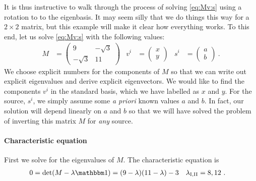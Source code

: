 \documentclass[12pt, oneside]{report}    %
\begin{document}
It is thus instructive to walk through the process of solving \eqref{eq:Mv:s} using a rotation to to the eigenbasis. It may seem silly that we do things this way for a $2\times 2$ matrix, but this example will make it clear how everything works. To this end, let us solve \eqref{eq:Mv:s} with the following values:
\begin{align}
    M &= 
    \begin{pmatrix}
        9 & -\sqrt{3}\\
        -\sqrt{3} & 11
    \end{pmatrix}
    &
    v^i &= 
    \begin{pmatrix}
        x \\ y
    \end{pmatrix}
    &
    s^i &=
    \begin{pmatrix}
        a \\ b
    \end{pmatrix} \ .
\end{align}
We choose explicit numbers for the components of $M$ so that we can write out explicit eigenvalues and derive explicit eigenvectors. We would like to find the components $v^i$ in the standard basis, which we have labelled as $x$ and $y$. For the source, $s^i$, we simply assume some \emph{a priori} known values $a$ and $b$. In fact, our solution will depend linearly on $a$ and $b$ so that we will have solved the problem of inverting this matrix $M$ for \emph{any} source. 


\paragraph{Characteristic equation} First we solve for the eigenvalues of $M$. The characteristic equation is
\begin{align}
    0=\det(M-\lambda \one) &= 
    (9-\lambda)(11-\lambda) - 3
    &
    \lambda_{\text{I},\text{II}}&= 8,12 \ .
\end{align}
\end{document}
